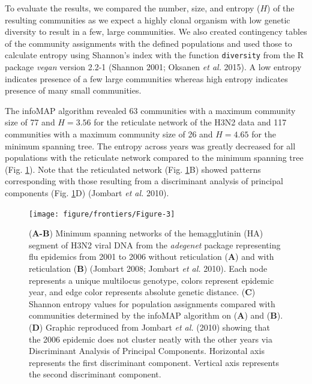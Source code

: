 \documentclass[double,12pt]{beavtex}
\begin{document}
  To evaluate the results, we compared the number, size, and entropy
  (\(H\)) of the resulting communities as we expect a highly clonal
  organism with low genetic diversity to result in a few, large
  communities. We also created contingency tables of the community
  assignments with the defined populations and used those to calculate
  entropy using Shannon's index with the function \texttt{diversity} from
  the R package \emph{vegan} version 2.2-1 (Shannon 2001; Oksanen \emph{et
  al.} 2015). A low entropy indicates presence of a few large communities
  whereas high entropy indicates presence of many small communities.
  
  The infoMAP algorithm revealed 63 communities with a maximum community
  size of 77 and \(H = 3.56\) for the reticulate network of the H3N2 data
  and 117 communities with a maximum community size of 26 and \(H = 4.65\)
  for the minimum spanning tree. The entropy across years was greatly
  decreased for all populations with the reticulate network compared to
  the minimum spanning tree (Fig. \ref{fig:Figure-3}). Note that the
  reticulated network (Fig. \ref{fig:Figure-3}B) showed patterns
  corresponding with those resulting from a discriminant analysis of
  principal components (Fig. \ref{fig:Figure-3}D) (Jombart \emph{et al.}
  2010).
  
  \begin{figure}
  
  {\centering \texttt{[image: figure/frontiers/Figure-3]} 
  
  }
  
  \caption[Minimum Spanning Networks with Reticulation]{(\textbf{A-B}) Minimum spanning networks of the hemagglutinin (HA)
  segment of H3N2 viral DNA from the \emph{adegenet} package representing
  flu epidemics from 2001 to 2006 without reticulation (\textbf{A}) and
  with reticulation (\textbf{B}) (Jombart 2008; Jombart \emph{et al.}
  2010). Each node represents a unique multilocus genotype, colors
  represent epidemic year, and edge color represents absolute genetic
  distance. (\textbf{C}) Shannon entropy values for population assignments
  compared with communities determined by the infoMAP algorithm on
  (\textbf{A}) and (\textbf{B}). (\textbf{D}) Graphic reproduced from
  Jombart \emph{et al.} (2010) showing that the 2006 epidemic does not
  cluster neatly with the other years via Discriminant Analysis of
  Principal Components. Horizontal axis represents the first discriminant
  component. Vertical axis represents the second discriminant component.}\label{fig:Figure-3}
  \end{figure}
  
\end{document}

